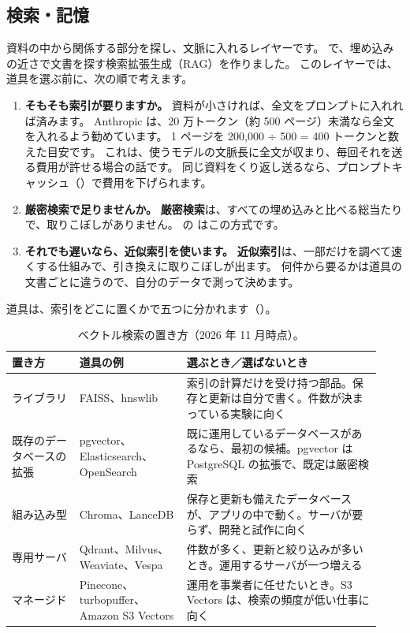 \subsection{検索・記憶}\label{sec:tm-rag}

資料の中から関係する部分を探し、文脈に入れるレイヤーです。
で、埋め込みの近さで文書を探す検索拡張生成（RAG）を作りました。
このレイヤーでは、道具を選ぶ前に、次の順で考えます。
\begin{enumerate}
\item \textbf{そもそも索引が要りますか。}
  資料が小さければ、全文をプロンプトに入れれば済みます。
  Anthropic は、20 万トークン（約 500 ページ）未満なら全文を入れるよう勧めています。
  1 ページを 200,000 ÷ 500 = 400 トークンと数えた目安です。
  これは、使うモデルの文脈長に全文が収まり、毎回それを送る費用が許せる場合の話です。
  同じ資料をくり返し送るなら、プロンプトキャッシュ（）で費用を下げられます。
\item \textbf{厳密検索で足りませんか。}
  \textbf{厳密検索}は、すべての埋め込みと比べる総当たりで、取りこぼしがありません。
  の  はこの方式です。
\item \textbf{それでも遅いなら、近似索引を使います。}
  \textbf{近似索引}は、一部だけを調べて速くする仕組みで、引き換えに取りこぼしが出ます。
  何件から要るかは道具の文書ごとに違うので、自分のデータで測って決めます。
\end{enumerate}
道具は、索引をどこに置くかで五つに分かれます（）。

\begin{table}[htbp]
\centering\footnotesize
\caption{ベクトル検索の置き方（2026 年 11 月時点）。}
\label{tab:tm-rag}
\begin{tabular}{@{}>{\raggedright\arraybackslash}p{0.17\linewidth}>{\raggedright\arraybackslash}p{0.27\linewidth}>{\raggedright\arraybackslash}p{0.49\linewidth}@{}}
\toprule
置き方 & 道具の例 & 選ぶとき／選ばないとき \\
\midrule
ライブラリ & FAISS、hnswlib & 索引の計算だけを受け持つ部品。保存と更新は自分で書く。件数が決まっている実験に向く \\
\addlinespace[2pt]
既存のデータベースの拡張 & pgvector、Elasticsearch、OpenSearch & 既に運用しているデータベースがあるなら、最初の候補。pgvector は PostgreSQL の拡張で、既定は厳密検索 \\
\addlinespace[2pt]
組み込み型 & Chroma、LanceDB & 保存と更新も備えたデータベースが、アプリの中で動く。サーバが要らず、開発と試作に向く \\
\addlinespace[2pt]
専用サーバ & Qdrant、Milvus、Weaviate、Vespa & 件数が多く、更新と絞り込みが多いとき。運用するサーバが一つ増える \\
\addlinespace[2pt]
マネージド & Pinecone、turbopuffer、Amazon S3 Vectors & 運用を事業者に任せたいとき。S3 Vectors は、検索の頻度が低い仕事に向く \\
\bottomrule
\end{tabular}
\end{table}

